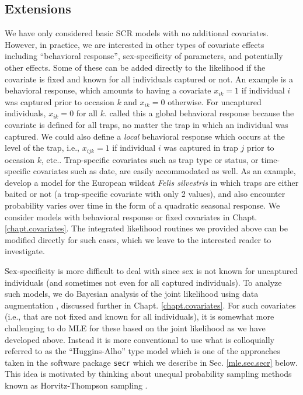 \subsection{ Extensions}

We have only considered basic SCR models with no additional
covariates. However, in practice, we are interested in other types of
covariate effects including ``behavioral response'', 
sex-specificity of parameters, and potentially other effects. Some of
these  can be added directly to the likelihood if the covariate is fixed
and known for all individuals captured or not. An example is a
behavioral response, which amounts to having a covariate $x_{ik}=1$ if
individual $i$ was captured prior to occasion $k$ and $x_{ik}=0$
otherwise. For uncaptured individuals, $x_{ik}=0$ for all $k$.
 \citet{royle_etal:2011jwm} called this a global behavioral
response because the covariate is defined for all traps, no matter the
trap in which an individual was captured. We could also define a {\it
  local} behavioral response which occurs at the level of the trap,
i.e., $x_{ijk}=1$ if individual $i$ was captured in trap $j$ prior to
occasion $k$, etc.. 
Trap-specific covariates such as trap type or status, or
time-specific covariates such as date, are easily accommodated as
well. As an example, \citet{kery_etal:2010} develop a model for the
European wildcat \emph{Felis silvestris}  in which traps are either baited or not (a
trap-specific covariate with only 2 values), and also encounter
probability varies over time in the form of a quadratic seasonal response.
We consider models with behavioral response or fixed covariates in
Chapt. \ref{chapt.covariates}.
The integrated likelihood routines we provided above can be
modified directly for such cases, which we leave to the interested
reader to investigate. 

Sex-specificity is more difficult to deal with since sex is not known
for uncaptured individuals (and sometimes not even for all captured
individuals).  To analyze such models, we do Bayesian analysis of the
joint likelihood using  data augmentation
\citep{gardner_etal:2010jwm,russell_etal:2012}, discussed further in
Chapt. \ref{chapt.covariates}. For such covariates (i.e., that are
not fixed and known for all individuals), it is somewhat more
challenging to do MLE for these based on the joint likelihood as we
have developed above. Instead it is more conventional to use what is
colloquially referred to as the ``Huggins-Alho'' type model which is
one of the approaches taken in the software package \mbox{\tt secr}
\citep[][]{efford:2011} which we describe
in Sec. \ref{mle.sec.secr} below. This idea is
motivated by thinking about unequal probability sampling methods known
as Horvitz-Thompson sampling \citep[e.g.,
see][]{overton_stehman:1995}.  



